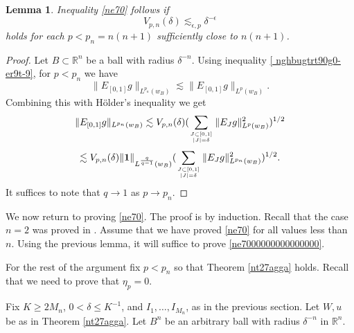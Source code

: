 \documentclass[amssymb,amsfonts,12pt]{amsart}
\newtheorem{lemma}[theorem]{Lemma}
\def\R{{\mathbb R}}
\begin{document}
\begin{lemma}Inequality \eqref{ne70} follows if
\begin{equation}
\label{ne7000000000000000}
V_{p,n}(\delta)\lesssim_{\epsilon,p} \delta^{-\epsilon}
\end{equation}
holds for each $p<p_n=n(n+1)$ sufficiently close to $n(n+1)$.
\end{lemma}
\begin{proof}
Let $B\subset \R^n$ be a ball with radius $\delta^{-n}$.
Using  inequality \eqref{ nghbugtrt90g0-er9t-9}, for  $p<p_n$ we have
$$\|E_{[0,1]}g\|_{L^{p_n}(w_{B})}\lesssim \|E_{[0,1]}g\|_{L^{p}(w_{B})}.$$
Combining this with H\"older's inequality we get
$$\|E_{[0,1]}g\|_{L^{p_n}(w_{B})}\lesssim V_{p,n}(\delta)(\sum_{J\subset [0,1]\atop{|J|=\delta}}\|E_Jg\|_{L^{p}(w_B)}^2)^{1/2}$$
$$\lesssim V_{p,n}(\delta)\|\textbf{1}\|_{L^{\frac{q}{q-1}}(w_B)}(\sum_{J\subset [0,1]\atop{|J|=\delta}}\|E_Jg\|_{L^{p_n}(w_B)}^2)^{1/2}.$$
It suffices to note that $q\to 1$ as $p\to p_n$.

\end{proof}

We now return to proving \eqref{ne70}. The proof is by induction. Recall that the case $n=2$ was proved in \cite{BD3}. Assume that we have proved \eqref{ne70} for all values less than $n$. Using the previous lemma, it will suffice to prove \eqref{ne7000000000000000}.

For the rest of the argument fix $p<p_n$ so that Theorem \ref{nt27agga} holds.
Recall that we need to prove that $\eta_p=0$.
\bigskip

Fix $K\ge 2M_n$, $0<\delta\le K^{-1}$, and $I_1,\ldots,I_{M_n}$, as in the previous section. Let  $W, u$ be as in Theorem \ref{nt27agga}.  Let $B^n$ be an arbitrary ball with radius $\delta^{-n}$ in $\R^n$.
\end{document}
